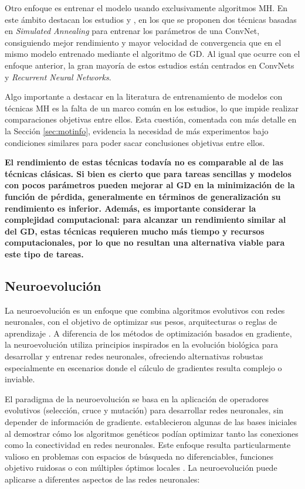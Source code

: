 Otro enfoque es entrenar el modelo usando exclusivamente algoritmos MH. En este ámbito destacan los estudios \cite{174} y \cite{176}, en los que se proponen dos técnicas basadas en \textit{Simulated Annealing} \cite{siman} para entrenar los parámetros de una ConvNet, consiguiendo mejor rendimiento y mayor velocidad de convergencia que en el mismo modelo entrenado mediante el algoritmo de GD. Al igual que ocurre con el enfoque anterior, la gran mayoría de estos estudios están centrados en ConvNets y \textit{Recurrent Neural Networks}. 

Algo importante a destacar en la literatura de entrenamiento de modelos con técnicas MH es la falta de un marco común en los estudios, lo que impide realizar comparaciones objetivas entre ellos. Esta cuestión, comentada con más detalle en la Sección \ref{sec:motinfo}, evidencia la necesidad de más experimentos bajo condiciones similares para poder sacar conclusiones objetivas entre ellos.

\textbf{El rendimiento de estas técnicas todavía no es comparable al de las técnicas clásicas. Si bien es cierto que para tareas sencillas y modelos con pocos parámetros pueden mejorar al GD en la minimización de la función de pérdida, generalmente en términos de generalización su rendimiento es inferior. Además, es importante considerar la complejidad computacional: para alcanzar un rendimiento similar al del GD, estas técnicas requieren mucho más tiempo y recursos computacionales, por lo que no resultan una alternativa viable para este tipo de tareas.}






\subsection{Neuroevolución}

La neuroevolución es un enfoque que combina algoritmos evolutivos con redes neuronales, con el objetivo de optimizar sus pesos, arquitecturas o reglas de aprendizaje \cite{Yao1999}. A diferencia de los métodos de optimización basados en gradiente, la neuroevolución utiliza principios inspirados en la evolución biológica para desarrollar y entrenar redes neuronales, ofreciendo alternativas robustas especialmente en escenarios donde el cálculo de gradientes resulta complejo o inviable.



El paradigma de la neuroevolución se basa en la aplicación de operadores evolutivos (selección, cruce y mutación) para desarrollar redes neuronales, sin depender de información de gradiente. \cite{Whitley1990} establecieron algunas de las bases iniciales al demostrar cómo los algoritmos genéticos podían optimizar tanto las conexiones como la conectividad en redes neuronales. Este enfoque resulta particularmente valioso en problemas con espacios de búsqueda no diferenciables, funciones objetivo ruidosas o con múltiples óptimos locales \cite{Stanley2019}. La neuroevolución puede aplicarse a diferentes aspectos de las redes neuronales:

